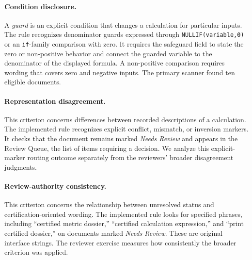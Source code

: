\documentclass[a4paper,fleqn]{cas-dc}
\begin{document}
\begin{center}
\begin{minipage}{\columnwidth}
\centering

\label{fig:sql-source-role}
\end{minipage}
\end{center}

\paragraph{Condition disclosure.} A \emph{guard} is an explicit condition that changes a calculation for particular inputs. The rule recognizes denominator guards expressed through \texttt{NULLIF(variable,0)} or an \texttt{if}-family comparison with zero. It requires the safeguard field to state the zero or non-positive behavior and connect the guarded variable to the denominator of the displayed formula. A non-positive comparison requires wording that covers zero and negative inputs. The primary scanner found ten eligible documents.

\paragraph{Representation disagreement.} This criterion concerns differences between recorded descriptions of a calculation. The implemented rule recognizes explicit conflict, mismatch, or inversion markers. It checks that the document remains marked \emph{Needs Review} and appears in the Review Queue, the list of items requiring a decision. We analyze this explicit-marker routing outcome separately from the reviewers' broader disagreement judgments.

\paragraph{Review-authority consistency.} This criterion concerns the relationship between unresolved status and certification-oriented wording. The implemented rule looks for specified phrases, including ``certified metric dossier,'' ``certified calculation expression,'' and ``print certified dossier,'' on documents marked \emph{Needs Review}. These are original interface strings. The reviewer exercise measures how consistently the broader criterion was applied.
\end{document}
